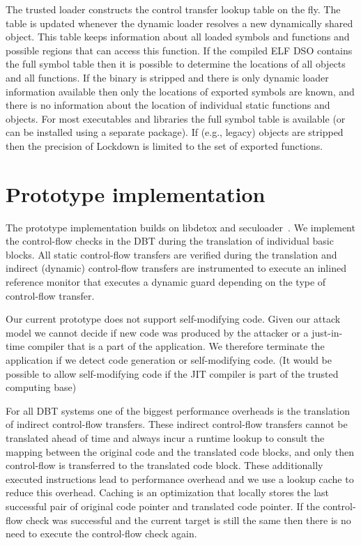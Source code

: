 \documentclass{acm_proc_article-sp}
\begin{document}
The trusted loader constructs the control transfer lookup table on the fly. The
table is updated whenever the dynamic loader resolves a new dynamically shared
object. This table keeps information about all loaded symbols and functions and
possible regions that can access this function. If the compiled ELF DSO contains
the full symbol table then it is possible to determine the locations of all objects
and all functions. If the binary is stripped and there is only dynamic loader
information available then only the locations of exported symbols are known, and
there is no information about the location of individual static functions and
objects. For most executables and libraries the full symbol table is available
(or can be installed using a separate package). If (e.g., legacy) objects
are stripped then the precision of Lockdown is limited to the set of exported functions.




\section{Prototype implementation}\label{sec:impl}


The prototype implementation builds on libdetox and seculoader~\cite{secuLoader,
libdetox}. We implement the control-flow checks in the DBT during the
translation of individual basic blocks. All static control-flow transfers are
verified during the translation and indirect (dynamic) control-flow transfers
are instrumented to execute an inlined reference monitor that executes a dynamic
guard depending on the type of control-flow transfer.

Our current prototype does not support self-modifying code. Given our attack
model we cannot decide if new code was produced by the attacker or a
just-in-time compiler that is a part of the application. We therefore terminate
the application if we detect code generation or self-modifying code.  (It would
be possible to allow self-modifying code if the JIT compiler is part of the
trusted computing base)


For all DBT systems one of the biggest performance overheads is the translation
of indirect control-flow transfers. These indirect control-flow transfers cannot
be translated ahead of time and always incur a runtime lookup to consult the
mapping between the original code and the translated code blocks, and only then
control-flow is transferred to the translated code block. These additionally
executed instructions lead to performance overhead and we use a lookup cache to
reduce this overhead.  Caching is an optimization that locally stores the last
successful pair of original code pointer and translated code pointer. If the
control-flow check was successful and the current target is still the same then
there is no need to execute the control-flow check again.
\end{document}
